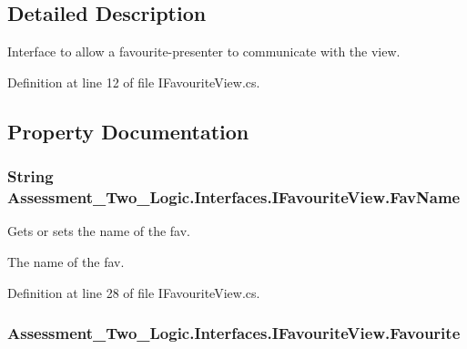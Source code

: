 \subsection{Detailed Description}
Interface to allow a favourite-\/presenter to communicate with the view. 

Definition at line 12 of file IFavouriteView.cs.



\subsection{Property Documentation}
\hypertarget{interface_assessment___two___logic_1_1_interfaces_1_1_i_favourite_view_afe418d8504ff1fc0979b923bfc3bc90f}{
\subsubsection[{FavName}]{\setlength{\rightskip}{0pt plus 5cm}String Assessment\_\-Two\_\-Logic.Interfaces.IFavouriteView.FavName}}
\label{interface_assessment___two___logic_1_1_interfaces_1_1_i_favourite_view_afe418d8504ff1fc0979b923bfc3bc90f}


Gets or sets the name of the fav. 

The name of the fav.

Definition at line 28 of file IFavouriteView.cs.

\hypertarget{interface_assessment___two___logic_1_1_interfaces_1_1_i_favourite_view_a1513304311c1bde9c6172dc7863b227b}{
\subsubsection[{Favourite}]{ Assessment\_\-Two\_\-Logic.Interfaces.IFavouriteView.Favourite}}
\label{interface_assessment___two___logic_1_1_interfaces_1_1_i_favourite_view_a1513304311c1bde9c6172dc7863b227b}


